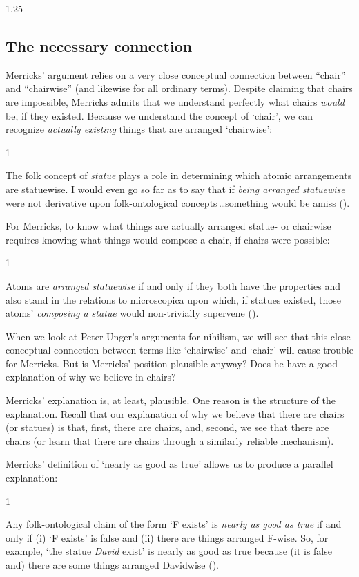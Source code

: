 \documentclass[11pt]{article}
\newenvironment{squote}{%
\begin{spacing}{1}
       	\begin{list}{}{%
\setlength{\labelwidth}{0pt}%
\rightmargin\leftmargin%
}
\item\relax
}{%
\end{list}%
\end{spacing}
}
\begin{document}
\begin{spacing}{1.25}
\subsection{The necessary connection}
\label{connection}
Merricks' argument relies on a very close conceptual connection
between ``chair'' and ``chairwise'' (and likewise for all ordinary
terms).  Despite claiming that chairs are impossible, Merricks admits
that we understand perfectly what chairs {\em would} be, if they
existed.  Because we understand the concept of `chair', we can
recognize {\em actually existing} things that are arranged
`chairwise':

\begin{squote}
The folk concept of \emph{statue} plays a role in determining which
atomic arrangements are statuewise. I would even go so far as to say
that if \emph{being arranged statuewise} were not derivative upon
folk-ontological concepts\,\ldots something would be amiss
(\citeyear[8]{merricks2001a}).
\end{squote}

For Merricks, to know what things are actually arranged statue- or
chairwise requires knowing what things would compose a chair, if
chairs were possible:

\begin{squote}
Atoms are \emph{arranged statuewise} if and only if they both have the
properties and also stand in the relations to microscopica upon which,
if statues existed, those atoms' \emph{composing a statue} would
non-trivially supervene (\citeyear[4]{merricks2001a}).
\end{squote}

When we look at Peter Unger's arguments for nihilism, we will see that
this close conceptual connection between terms like `chairwise' and
`chair' will cause trouble for Merricks.  But is Merricks' position
plausible anyway?  Does he have a good explanation of why we believe
in chairs?

Merricks' explanation is, at least, plausible.  One reason is the
structure of the explanation.  Recall that our explanation of why we
believe that there are chairs (or statues) is that, first, there are
chairs, and, second, we see that there are chairs (or learn that there
are chairs through a similarly reliable mechanism).  

Merricks' definition of `nearly as good as true' allows us to produce
a parallel explanation:

\begin{squote}
Any folk-ontological claim of the form `F exists' is \emph{nearly as
  good as true} if and only if (i) `F exists' is false and (ii) there
are things arranged F-wise. So, for example, `the statue \emph{David}
exist' is nearly as good as true because (it is false and) there are
some things arranged Davidwise (\citeyear[171]{merricks2001a}).
\end{squote}


\end{spacing}
\end{document}
